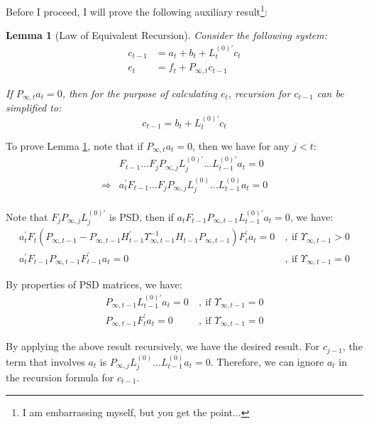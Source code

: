 \documentclass[10pt]{article}
\newtheorem{lemma}{Lemma}
\numberwithin{equation}{section}
\begin{document}
Before I proceed, I will prove the following auxiliary result\footnote{I am embarrassing myself, but you get the point...}:
\begin{lemma}[Law of Equivalent Recursion] \label{lem:2}
    Consider the following system:
    \begin{align*}
        c_{t-1} &= a_t + b_t + L_{t}^{(0)'}c_t \\
        e_t &= f_t + P_{\infty,t}c_{t-1}
    \end{align*}

    If $P_{\infty,t}a_t=0$, then for the purpose of calculating $e_t$, recursion for $c_{t-1}$ can be simplified to:
    \[
        c_{t-1} = b_t + L_t^{(0)'}c_t
    \]
\end{lemma}

To prove Lemma \ref{lem:2}, note that if $P_{\infty,t}a_t=0$, then we have for any $j<t$:
\begin{align*}
    & F_{t-1}...F_jP_{\infty,j}L_{j}^{(0)'}...L_{t-1}^{(0)'}a_t=0 \\
    \Rightarrow & a_t^{'}F_{t-1}...F_jP_{\infty,j}L_{j}^{(0)}...L_{t-1}^{(0)}a_t=0 \\
\end{align*}

Note that $F_jP_{\infty,j}L_j^{(0)'}$ is PSD, then if $a_tF_{t-1}P_{\infty,t-1}L_{t-1}^{(0)'}a_t=0$, we have:
\begin{align*}
    a_t^{'}F_t(P_{\infty,t-1}-P_{\infty,t-1}H_{t-1}^{'}\Upsilon_{\infty,t-1}^{-1}H_{t-1}P_{\infty,t-1})F_t^{'}a_t=0\ &,\ \text{if } \Upsilon_{\infty,t-1}>0 \\
    a_t^{'}F_{t-1}P_{\infty,t-1}F_{t-1}^{'}a_t=0\ &,\ \text{if } \Upsilon_{\infty,t-1}=0 
\end{align*}

By properties of PSD matrices, we have:
\begin{align*}
    P_{\infty,t-1}L_{t-1}^{(0)'}a_t=0\ &,\ \text{if } \Upsilon_{\infty,t-1}=0 \\
    P_{\infty,t-1}F_t^{'}a_t=0\ &,\ \text{if } \Upsilon_{\infty,t-1}=0
\end{align*}

By applying the above result recursively, we have the desired result. For $c_{j-1}$, the term that involves $a_t$ is $P_{\infty,j}L_{j}^{(0)}...L_{t-1}^{(0)}a_t=0$. Therefore, we can ignore $a_t$ in the recursion formula for $c_{t-1}$. 
\end{document}
